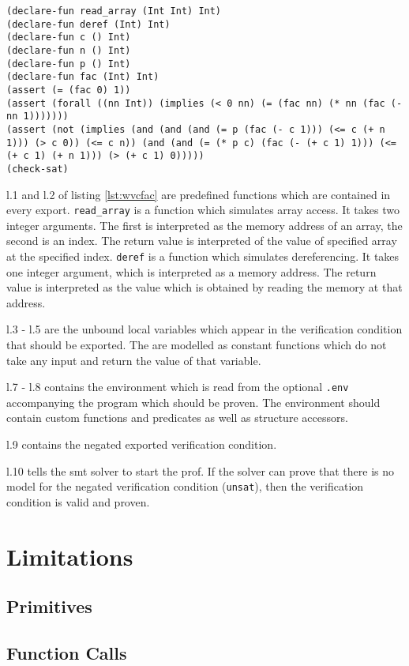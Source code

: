 \documentclass[12pt]{article}
\begin{document}
\begin{minipage}{\linewidth}
\begin{lstlisting}[style=c0, caption=an exported verification condition, label=lst:wvcfac]
(declare-fun read_array (Int Int) Int)
(declare-fun deref (Int) Int)
(declare-fun c () Int)
(declare-fun n () Int)
(declare-fun p () Int)
(declare-fun fac (Int) Int)
(assert (= (fac 0) 1))
(assert (forall ((nn Int)) (implies (< 0 nn) (= (fac nn) (* nn (fac (- nn 1)))))))
(assert (not (implies (and (and (and (= p (fac (- c 1))) (<= c (+ n 1))) (> c 0)) (<= c n)) (and (and (= (* p c) (fac (- (+ c 1) 1))) (<= (+ c 1) (+ n 1))) (> (+ c 1) 0)))))
(check-sat)
\end{lstlisting}
\end{minipage}

l.1 and l.2 of listing \ref{lst:wvcfac} are predefined functions which are contained in every export.
\texttt{read\_array} is a function which simulates array access. It takes two integer arguments.
The first is interpreted as the memory address of an array, the second is an index.
The return value is interpreted of the value of specified array at the specified index.
\texttt{deref} is a function which simulates dereferencing.
It takes one integer argument, which is interpreted as a memory address.
The return value is interpreted as the value which is obtained by reading the memory at that address.

l.3 - l.5 are the unbound local variables which appear in the verification condition that should be exported.
The are modelled as constant functions which do not take any input and return the value of that variable.

l.7 - l.8 contains the environment which is read from the optional \texttt{.env} accompanying the program which should be proven.
The environment should contain custom functions and predicates as well as structure accessors.

l.9 contains the negated exported verification condition.

l.10 tells the smt solver to start the prof. 
If the solver can prove that there is no model for the negated verification condition (\texttt{unsat}), then the verification condition is valid and proven.

\section{Limitations}

\subsection{Primitives}
\label{primitives}

\subsection{Function Calls}
\label{funcalls}
\end{document}
